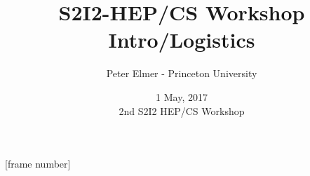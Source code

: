 \documentclass{beamer}
\title{S2I2-HEP/CS Workshop Intro/Logistics}
\author{Peter Elmer - Princeton University}
\date{1 May, 2017 \\ 2nd S2I2 HEP/CS Workshop}
\begin{document}
\maketitle

%
%

[frame number]















\end{document}
